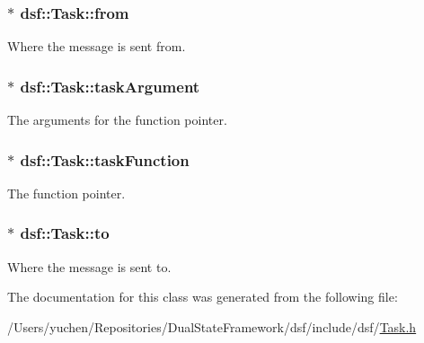 \subsubsection[{from}]{$\ast$ dsf\+::\+Task\+::from}\label{classdsf_1_1_task_afc1faf30dab0d57501dfdcb4ef7b5450}
Where the message is sent from. \hypertarget{classdsf_1_1_task_a8a095d8a36668f6500d4df8c24dbef8d}{}
\subsubsection[{task\+Argument}]{$\ast$ dsf\+::\+Task\+::task\+Argument}\label{classdsf_1_1_task_a8a095d8a36668f6500d4df8c24dbef8d}
The arguments for the function pointer. \hypertarget{classdsf_1_1_task_a681617cab34fbae641c5b0cf4be46659}{}
\subsubsection[{task\+Function}]{$\ast$ dsf\+::\+Task\+::task\+Function}\label{classdsf_1_1_task_a681617cab34fbae641c5b0cf4be46659}
The function pointer. \hypertarget{classdsf_1_1_task_a36c485fbeb9c2330f5637b9d625cf01a}{}
\subsubsection[{to}]{$\ast$ dsf\+::\+Task\+::to}\label{classdsf_1_1_task_a36c485fbeb9c2330f5637b9d625cf01a}
Where the message is sent to. 

The documentation for this class was generated from the following file\+:\begin{DoxyCompactItemize}
\item 
/\+Users/yuchen/\+Repositories/\+Dual\+State\+Framework/dsf/include/dsf/\hyperlink{_task_8h}{Task.\+h}\end{DoxyCompactItemize}
